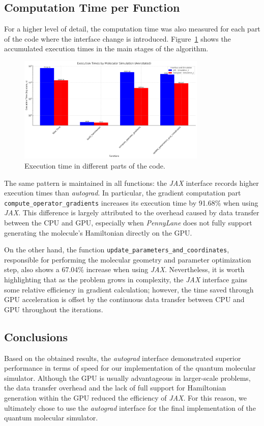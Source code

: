 \subsection{Computation Time per Function}
For a higher level of detail, the computation time was also measured for each part of the code where the interface change is introduced. Figure~\ref{fig:time_functions} shows the accumulated execution times in the main stages of the algorithm.

\begin{figure}[H]
  \centering
  \includegraphics[width=0.8\textwidth]{img/time_functions.png}
  \caption{Execution time in different parts of the code.}
  \label{fig:time_functions}
\end{figure}

The same pattern is maintained in all functions: the \textit{JAX} interface records higher execution times than \textit{autograd}. In particular, the gradient computation part \texttt{compute\_operator\_gradients} increases its execution time by 91.68\% when using \textit{JAX}. This difference is largely attributed to the overhead caused by data transfer between the CPU and GPU, especially when \textit{PennyLane} does not fully support generating the molecule's Hamiltonian directly on the GPU.

On the other hand, the function \texttt{update\_parameters\_and\_coordinates}, responsible for performing the molecular geometry and parameter optimization step, also shows a 67.04\% increase when using \textit{JAX}. Nevertheless, it is worth highlighting that as the problem grows in complexity, the \textit{JAX} interface gains some relative efficiency in gradient calculation; however, the time saved through GPU acceleration is offset by the continuous data transfer between CPU and GPU throughout the iterations.

\subsection{Conclusions}
Based on the obtained results, the \textit{autograd} interface demonstrated superior performance in terms of speed for our implementation of the quantum molecular simulator. Although the GPU is usually advantageous in larger-scale problems, the data transfer overhead and the lack of full support for Hamiltonian generation within the GPU reduced the efficiency of \textit{JAX}. For this reason, we ultimately chose to use the \textit{autograd} interface for the final implementation of the quantum molecular simulator.

